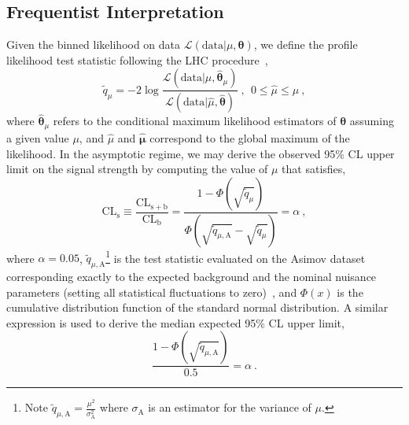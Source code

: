 


\subsection{Frequentist Interpretation}

Given the binned likelihood on data $\mathcal
L(\mathrm{data}|\mu,\boldsymbol{\theta})$, we define the profile
likelihood test statistic following the LHC \CLs procedure~\cite{LHCCLs},
\begin{equation}
\tilde q_{\mu} = -2\log\frac{\mathcal
  L(\mathrm{data}|\mu,\boldsymbol{\hat\theta}_{\mu})}{\mathcal
  L(\mathrm{data}|\hat\mu, \boldsymbol{\hat\theta})} ~,~~
0\leq\hat\mu\leq\mu~,
\label{eqn:LHCteststat}
\end{equation}
where $\boldsymbol{\hat\theta}_{\mu}$ refers to the conditional maximum
likelihood estimators of $\boldsymbol{\theta}$ assuming a given value
$\mu$, and $\hat\mu$ and $\boldsymbol{\hat\mu}$ correspond to the
global maximum of the likelihood. In the asymptotic regime, we may
derive the observed 95\% CL upper limit on the signal strength by
computing the value of $\mu$ that satisfies, 
\begin{equation}
\mathrm{CL}_{\mathrm{s}}\equiv
\frac{\mathrm{CL}_{\mathrm{s+b}}}{\mathrm{CL}_{\mathrm{b}}} = 
\frac{1-\Phi(\sqrt{\tilde
    q_{\mu}})}{\Phi(\sqrt{\tilde q_{\mu,\mathrm{A}}} - \sqrt{\tilde
    q_{\mu}} ) } = \alpha ~,
\end{equation}
where $\alpha = 0.05$, $\tilde q_{\mu,\mathrm{A}}$\footnote{Note $\tilde
  q_{\mu,\mathrm{A}} = \frac{\mu^2}{\sigma_{\mathrm{A}}^2}$ where
  $\sigma_{\mathrm{A}}$ is an estimator for the variance of $\mu$.} is the test statistic evaluated on
the Asimov dataset~\cite{Asimov} corresponding exactly to the expected
background and the nominal nuisance parameters (setting all
statistical fluctuations to zero)~\cite{Cowan:2010js,LHCCLs}, and 
$\Phi(x)$ is the cumulative distribution function of the standard
normal distribution. A similar expression is used to derive the median expected 95\% CL upper limit, 
\begin{equation}
\frac{1-\Phi(\sqrt{\tilde q_{\mu,\mathrm{A}}})}{0.5} = \alpha ~.
\end{equation}

